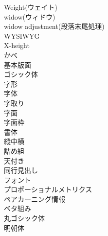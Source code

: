 \begin{description}
    \item[Weight(ウェイト)]
    \item[widow(ウィドウ)]
    \item[widow adjustment(段落末尾処理)]
    \item[WYSIWYG]
    \item[X-height]
    \item[かべ]
    \item[基本版面]
    \item[ゴシック体]
    \item[字形]
    \item[字体]
    \item[字取り]
    \item[字面]
    \item[字面枠]
    \item[書体]
    \item[縦中横]
    \item[詰め組]
    \item[天付き]
    \item[同行見出し]
    \item[フォント]
    \item[プロポーショナルメトリクス]
    \item[ペアカーニング情報]
    \item[ベタ組み]
    \item[丸ゴシック体]
    \item[明朝体]
\end{description}

